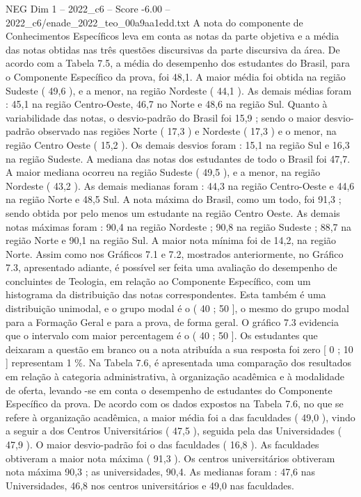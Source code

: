\begin{textsample}{NEG Dim 1 – 2022\_c6 – Score -6.00 – 2022\_c6/enade\_2022\_teo\_00a9aa1edd.txt}
A nota do componente de Conhecimentos Específicos leva em conta as notas da parte objetiva e a média das notas obtidas nas três questões discursivas da parte discursiva da área.
De acordo com a Tabela 7.5, a média do desempenho dos estudantes do Brasil, para o Componente Específico da prova, foi 48,1.
A maior média foi obtida na região Sudeste ( 49,6 ), e a menor, na região Nordeste ( 44,1 ).
As demais médias foram : 45,1 na região Centro-Oeste, 46,7 no Norte e 48,6 na região Sul.
Quanto à variabilidade das notas, o desvio-padrão do Brasil foi 15,9 ; sendo o maior desvio-padrão observado nas regiões Norte ( 17,3 ) e Nordeste ( 17,3 ) e o menor, na região Centro Oeste ( 15,2 ).
Os demais desvios foram : 15,1 na região Sul e 16,3 na região Sudeste.
A mediana das notas dos estudantes de todo o Brasil foi 47,7.
A maior mediana ocorreu na região Sudeste ( 49,5 ), e a menor, na região Nordeste ( 43,2 ).
As demais medianas foram : 44,3 na região Centro-Oeste e 44,6 na região Norte e 48,5 Sul.
A nota máxima do Brasil, como um todo, foi 91,3 ; sendo obtida por pelo menos um estudante na região Centro Oeste.
As demais notas máximas foram : 90,4 na região Nordeste ; 90,8 na região Sudeste ; 88,7 na região Norte e 90,1 na região Sul.
A maior nota mínima foi de 14,2, na região Norte.
Assim como nos Gráficos 7.1 e 7.2, mostrados anteriormente, no Gráfico 7.3, apresentado adiante, é possível ser feita uma avaliação do desempenho de concluintes de Teologia, em relação ao Componente Específico, com um histograma da distribuição das notas correspondentes.
Esta também é uma distribuição unimodal, e o grupo modal é o ( 40 ; 50 ], o mesmo do grupo modal para a Formação Geral e para a prova, de forma geral.
O gráfico 7.3 evidencia que o intervalo com maior percentagem é o ( 40 ; 50 ].
Os estudantes que deixaram a questão em branco ou a nota atribuída a sua resposta foi zero [ 0 ; 10 ] representam 1 \%.
Na Tabela 7.6, é apresentada uma comparação dos resultados em relação à categoria administrativa, à organização acadêmica e à modalidade de oferta, levando -se em conta o desempenho de estudantes do Componente Específico da prova.
De acordo com os dados expostos na Tabela 7.6, no que se refere à organização acadêmica, a maior média foi a das faculdades ( 49,0 ), vindo a seguir a dos Centros Universitários ( 47,5 ), seguida pela das Universidades ( 47,9 ).
O maior desvio-padrão foi o das faculdades ( 16,8 ).
As faculdades obtiveram a maior nota máxima ( 91,3 ).
Os centros universitários obtiveram nota máxima 90,3 ; as universidades, 90,4.
As medianas foram : 47,6 nas Universidades, 46,8 nos centros universitários e 49,0 nas faculdades.

\end{textsample}

